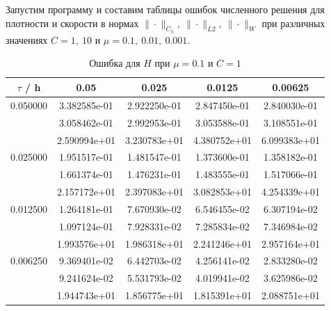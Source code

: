\documentclass[specialist,subf,href,colorlinks=true,12pt
,times,mtpro,specialist
]{disser}
\begin{document}
Запустим программу и составим таблицы ошибок численного решения для плотности и скорости в нормах $\|\cdot \|_{C_h},\ \| \cdot \|_{L2},\ \| \cdot \|_W$ при различных значениях $C = 1,\ 10$ и $\mu = 0.1,\ 0.01,\ 0.001.$

\begin{table}[H]
\small
\caption{Ошибка для $H$ при $\mu=0.1$ и $C = 1$}
\begin{center}
\begin{tabular}{|c|c|c|c|c|}
\hline
$\tau$ / h & 0.05 & 0.025 & 0.0125 & 0.00625 \\
\hline
0.050000 & 3.382585e-01  & 2.922250e-01  & 2.847450e-01  & 2.840030e-01 \\
 & 3.058462e-01  & 2.992953e-01  & 3.053588e-01  & 3.108551e-01 \\
 & 2.590994e+01  & 3.230783e+01  & 4.380752e+01  & 6.099383e+01 \\
\hline
0.025000 & 1.951517e-01  & 1.481547e-01  & 1.373600e-01  & 1.358182e-01 \\
 & 1.661374e-01  & 1.476231e-01  & 1.483555e-01  & 1.517066e-01 \\
 & 2.157172e+01  & 2.397083e+01  & 3.082853e+01  & 4.254339e+01 \\
\hline
0.012500 & 1.264181e-01  & 7.670930e-02  & 6.546455e-02  & 6.307194e-02 \\
 & 1.097124e-01  & 7.928331e-02  & 7.285834e-02  & 7.346984e-02 \\
 & 1.993576e+01  & 1.986318e+01  & 2.241246e+01  & 2.957164e+01 \\
\hline
0.006250 & 9.369401e-02  & 6.442703e-02  & 4.256141e-02  & 2.833280e-02 \\
 & 9.241624e-02  & 5.531793e-02  & 4.019941e-02  & 3.625986e-02 \\
 & 1.944743e+01  & 1.856775e+01  & 1.815391e+01  & 2.088751e+01 \\
\hline
\end{tabular}
\end{center}
\end{table}
\end{document}

